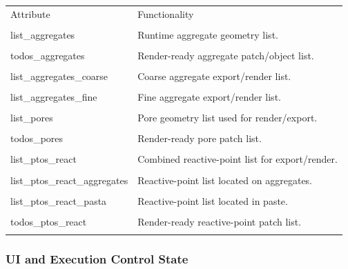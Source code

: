 ﻿\documentclass[11pt,a4paper]{article}
\begin{document}
\begin{longtable}{|p{}|p{}|}
\hline
Attribute & Functionality \\\\
\hline
list\_aggregates & Runtime aggregate geometry list. \\\\
\hline
todos\_aggregates & Render-ready aggregate patch/object list. \\\\
\hline
list\_aggregates\_coarse & Coarse aggregate export/render list. \\\\
\hline
list\_aggregates\_fine & Fine aggregate export/render list. \\\\
\hline
list\_pores & Pore geometry list used for render/export. \\\\
\hline
todos\_pores & Render-ready pore patch list. \\\\
\hline
list\_ptos\_react & Combined reactive-point list for export/render. \\\\
\hline
list\_ptos\_react\_aggregates & Reactive-point list located on aggregates. \\\\
\hline
list\_ptos\_react\_pasta & Reactive-point list located in paste. \\\\
\hline
todos\_ptos\_react & Render-ready reactive-point patch list. \\\\
\hline
\end{longtable}


\subsubsection*{UI and Execution Control State}
\end{document}

